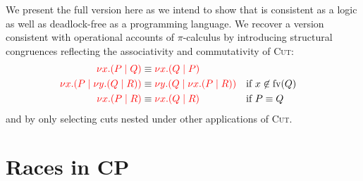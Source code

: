 \documentclass[a4paper,UKenglish]{lipics-v2016}
\begin{document}
%
We present the full version here as we intend to show that \nodcap is consistent
as a logic as well as deadlock-free as a programming language.
%
We recover a version consistent with operational accounts of $\pi$-calculus by
introducing structural congruences reflecting the associativity and
commutativity of \textsc{Cut}:
\begin{align*}
  \textcolor{red}{{\nu x.} (P \mid Q)} &\equiv \textcolor{red}{{\nu x.} (Q \mid P)} \\
  \textcolor{red}{{\nu x.} (P \mid {\ensuremath{\nu y.}} (Q \mid R))} &\equiv \textcolor{red}{{\nu y.} (Q \mid {\ensuremath{\nu x.}} (P \mid R))} && \text{if $x \not\in \text{fv}(Q)$} \\
  \textcolor{red}{{\nu x.} (P \mid R)} &\equiv \textcolor{red}{{\nu x.} (Q \mid R)} &&\text{if $P \equiv Q$}
\end{align*}
and by only selecting cuts nested under other applications of \textsc{Cut}.
%




\section{Races in CP}
\label{sec:races}
\end{document}
